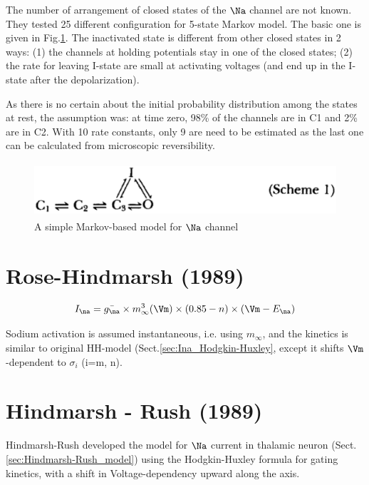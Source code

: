 The number of arrangement of closed states of the $\Na$ channel are not known.
They tested 25 different configuration for 5-state Markov model. The basic one
is given in Fig.\ref{fig:Ina_scheme1_Horn1984}. The inactivated state is
different from other closed states in 2 ways: (1) the channels at holding
potentials stay in one of the closed states; (2) the rate for leaving I-state
are small at activating voltages (and end up in the I-state after the
depolarization). 

As there is no certain about the initial probability distribution among the
states at rest, the assumption was: at time zero, 98\% of the channels are in C1
and 2\% are in C2. With 10 rate constants, only 9 are need to be estimated as
the last one can be calculated from microscopic reversibility.

\begin{figure}[hbt]
 \centerline{\includegraphics[height=2cm,
 angle=0]{./images/Na_scheme1_Horn1984.eps}}
\caption{A simple Markov-based model for $\Na$ channel}
\label{fig:Ina_scheme1_Horn1984}
\end{figure}



\section{Rose-Hindmarsh (1989)}
\label{sec:Ina_Rose-Hindmarsh-1989}

\begin{equation}
I_\na = \bar{g_\na} \times m_\infty^3(\Vm) \times (0.85 - n) \times (\Vm -
E_\na)
\end{equation}

Sodium activation is assumed instantaneous, i.e. using $m_\infty$, and the
kinetics is similar to original HH-model (Sect.\ref{sec:Ina_Hodgkin-Huxley},
except it shifts $\Vm$-dependent to $\sigma_i$ (i=m, n).
  
\section{Hindmarsh - Rush (1989)}
\label{sec:Ina_Hindmarsh-Rush-1989}

Hindmarsh-Rush developed the model for $\Na$ current in
thalamic neuron (Sect.\ref{sec:Hindmarsh-Rush_model}) using the Hodgkin-Huxley formula
for gating kinetics, with a shift in Voltage-dependency upward along the axis.


